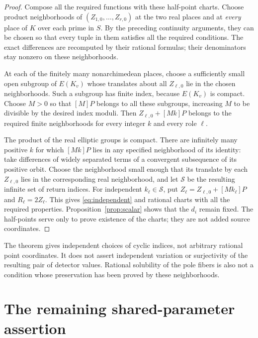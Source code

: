 \documentclass[11pt,a4paper]{article}
\theoremstyle{remark}\newtheorem{remark}[theorem]{Remark}
\begin{document}
\begin{proof}
Compose all the required functions with these half-point charts.
Choose product neighborhoods of $(Z_{1,0},\ldots,Z_{r,0})$ at
the two real places and at \emph{every} place of $K$ over each
prime in $S$. By the preceding continuity arguments, they can be
chosen so that every tuple in them satisfies all the required
conditions. The exact differences are recomputed by their rational
formulas; their denominators stay nonzero on these neighborhoods.

At each of the finitely many nonarchimedean places, choose a
sufficiently small open subgroup of $E(K_v)$ whose translates
about all $Z_{\ell,0}$ lie in the chosen neighborhoods. Such a
subgroup has finite index, because $E(K_v)$ is compact. Choose
$M>0$ so that $[M]P$ belongs to all these subgroups, increasing
$M$ to be divisible by the desired index moduli. Then
$Z_{\ell,0}+[Mk]P$ belongs to the required finite neighborhoods
for every integer $k$ and every role $\ell$.

The product of the real elliptic groups is compact. There are
infinitely many positive $k$ for which $[Mk]P$ lies in any
specified neighborhood of its identity: take differences of widely
separated terms of a convergent subsequence of its positive orbit.
Choose the neighborhood small enough that its translate by each
$Z_{\ell,0}$ lies in the corresponding real neighborhood, and let
$\mathcal S$ be the resulting infinite set of return indices.
For independent $k_\ell\in\mathcal S$, put
$Z_\ell=Z_{\ell,0}+[Mk_\ell]P$ and $R_\ell=2Z_\ell$.
This gives \eqref{eq:independent} and rational charts with all
the required properties. Proposition~\ref{prop:scalar} shows
that the $d_i$ remain fixed. The half-points serve only to prove
existence of the charts; they are not added source coordinates.
\end{proof}

The theorem gives independent choices of cyclic indices, not arbitrary
rational point coordinates. It does not assert independent variation or
surjectivity of the resulting pair of detector values. Rational solubility
of the pole fibers is also not a condition whose preservation has been
proved by these neighborhoods.

\section{The remaining shared-parameter assertion}
\end{document}
